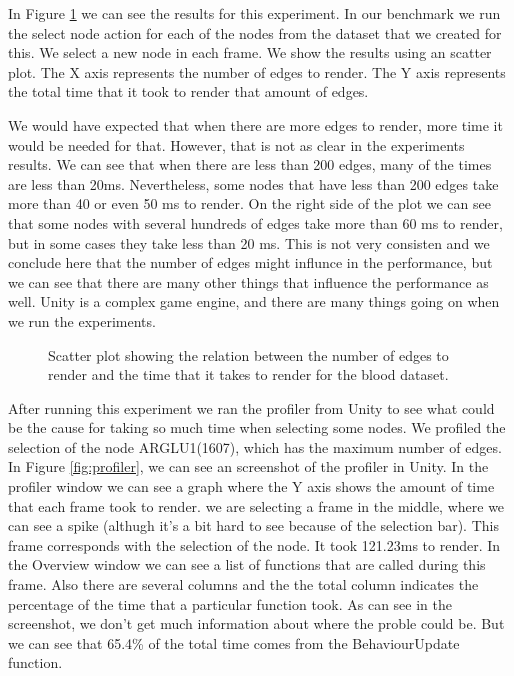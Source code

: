 In Figure \ref{fig:scalability_edges_blood} we can see the results for this experiment. In our benchmark we run the select node action for each of the nodes from the dataset that we created for this. We select a new node in each frame. We show the results using an scatter plot. The X axis represents the number of edges to render. The Y axis represents the total time that it took to render that amount of edges.

We would have expected that when there are more edges to render, more time it would be needed for that. However, that is not as clear in the experiments results. We can see that when there are less than 200 edges, many of the times are less than 20ms. Nevertheless, some nodes that have less than 200 edges take more than 40 or even 50 ms to render. On the right side of the plot we can see that some nodes with several hundreds of edges take more than 60 ms to render, but in some cases they take less than 20 ms. This is not very consisten and we conclude here that the number of edges might influnce in the performance, but we can see that there are many other things that influence the performance as well. Unity is a complex game engine, and there are many things going on when we run the experiments.

\begin{figure}[h!]
  \centering
  \begin{minipage}{.8\textwidth}
  \end{minipage}
\caption{Scatter plot showing the relation between the number of edges to render and the time that it takes to render for the blood dataset.}
\label{fig:scalability_edges_blood}
\end{figure}

After running this experiment we ran the profiler from Unity to see what could be the cause for taking so much time when selecting some nodes. We profiled the selection of the node ARGLU1(1607), which has the maximum number of edges. In Figure \ref{fig:profiler}, we can see an screenshot of the profiler in Unity. In the profiler window we can see a graph where the Y axis shows the amount of time that each frame took to render. we are selecting a frame in the middle, where we can see a spike (althugh it's a bit hard to see because of the selection bar). This frame corresponds with the selection of the node. It took 121.23ms to render. In the Overview window we can see a list of functions that are called during this frame. Also there are several columns and the the total column indicates the percentage of the time that a particular function took. As can see in the screenshot, we don't get much information about where the proble could be. But we can see that 65.4\% of the total time comes from the BehaviourUpdate function.

